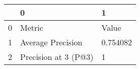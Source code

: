 \begin{tabular}{lll}
\toprule
{} &                     0 &         1 \\
\midrule
0 &                Metric &     Value \\
1 &     Average Precision &  0.754082 \\
2 &  Precision at 3 (P@3) &         1 \\
\bottomrule
\end{tabular}
